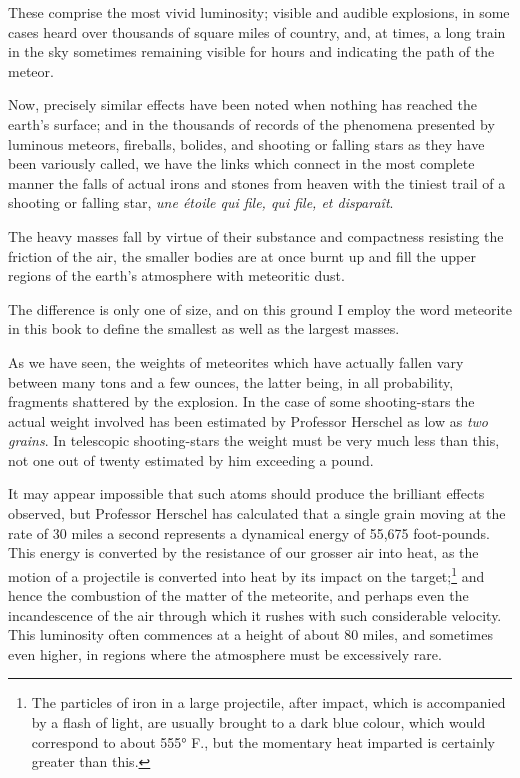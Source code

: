 \documentclass[a4paper, 12pt, oneside, polutonikogreek, english]{article}
\begin{document}
These comprise the most vivid luminosity; visible and audible explosions, in some cases heard over thousands of square miles of country, and, at times, a long train in the sky sometimes remaining visible for hours and indicating the path of the meteor.

Now, precisely similar effects have been noted when nothing has reached the earth's surface; and in the thousands of records of the phenomena presented by luminous meteors, fireballs, bolides, and shooting or falling stars as they have been variously called, we have the links which connect in the most complete manner the falls of actual irons and stones from heaven with the tiniest trail of a shooting or falling star, \emph{une étoile qui file, qui file, et disparaît}.

The heavy masses fall by virtue of their substance and compactness resisting the friction of the air, the smaller bodies are at once burnt up and fill the upper regions of the earth's atmosphere with meteoritic dust.

The difference is only one of size, and on this ground I employ the word meteorite in this book to define the smallest as well as the largest masses.

As we have seen, the weights of meteorites which have actually fallen vary between many tons and a few ounces, the latter being, in all probability, fragments shattered by the explosion. In the case of some shooting-stars the actual weight involved has been estimated by Professor Herschel as low as \emph{two grains}. In telescopic shooting-stars the weight must be very much less than this, not one out of twenty estimated by him exceeding a pound.

It may appear impossible that such atoms should produce the brilliant effects observed, but Professor Herschel has calculated that a single grain moving at the rate of 30 miles a second represents a dynamical energy of 55,675 foot-pounds. This energy is converted by the resistance of our grosser air into heat, as the motion of a projectile is converted into heat by its impact on the target;\footnote{The particles of iron in a large projectile, after impact, which is accompanied by a flash of light, are usually brought to a dark blue colour, which would correspond to about 555° F., but the momentary heat imparted is certainly greater than this.} and hence the combustion of the matter of the meteorite, and perhaps even the incandescence of the air through which it rushes with such considerable velocity. This luminosity often commences at a height of about 80 miles, and sometimes even higher, in regions where the atmosphere must be excessively rare.
\end{document}
